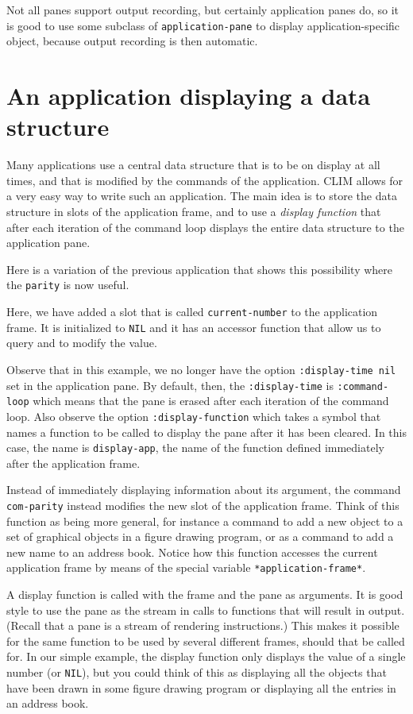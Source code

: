 Not all panes support output recording, but certainly application
panes do, so it is good to use some subclass of
\texttt{application-pane} to display application-specific object,
because output recording is then automatic.

\section{An application displaying a data structure}

Many applications use a central data structure that is to be on
display at all times, and that is modified by the commands of the
application.  CLIM allows for a very easy way to write such an
application.  The main idea is to store the data structure in slots of
the application frame, and to use a \emph{display function} that after
each iteration of the command loop displays the entire data structure
to the application pane.

Here is a variation of the previous application that shows this
possibility where the \texttt{parity} is now useful.



Here, we have added a slot that is called \texttt{current-number} to
the application frame.  It is initialized to \texttt{NIL} and it has
an accessor function that allow us to query and to modify the value.

Observe that in this example, we no longer have the option
\texttt{:display-time nil} set in the application pane.  By default,
then, the \texttt{:display-time} is \texttt{:command-loop} which means
that the pane is erased after each iteration of the command loop.
Also observe the option \texttt{:display-function} which takes a
symbol that names a function to be called to display the pane after it
has been cleared.  In this case, the name is \texttt{display-app}, the
name of the function defined immediately after the application frame.

Instead of immediately displaying information about its argument, the
command \texttt{com-parity} instead modifies the new slot of the
application frame.  Think of this function as being more general, for
instance a command to add a new object to a set of graphical objects
in a figure drawing program, or as a command to add a new name to an
address book.  Notice how this function accesses the current
application frame by means of the special variable
\texttt{*application-frame*}.

A display function is called with the frame and the pane as arguments.
It is good style to use the pane as the stream in calls to functions
that will result in output.  (Recall that a pane is a stream of
rendering instructions.) This makes it possible for the same function
to be used by several different frames, should that be called for.  In
our simple example, the display function only displays the value of a
single number (or \texttt{NIL}), but you could think of this as
displaying all the objects that have been drawn in some figure drawing
program or displaying all the entries in an address book.

